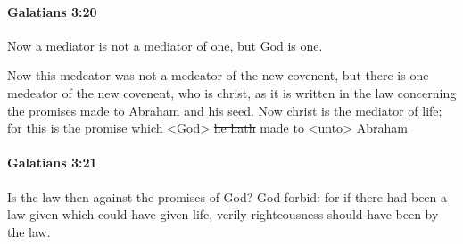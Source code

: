 		\paragraph{Galatians 3:20} %
			\label{GALATIANS-3-20}

			Now a mediator is not a mediator of one, but God is one.

			\begin{framed}
			\scriptsize
				\begin{compactdesc}
					\item[SBLG] 
					\item[NTR2] Now this medeator was not a medeator of the new covenent, but there is one medeator of the new covenent, who is christ, as it is written in the law concerning the promises made to Abraham and his seed. Now christ is the mediator of life; for this is the promise which <God> \sout{he hath} made to <unto> Abraham
				\end{compactdesc}
			\end{framed}

		\paragraph{Galatians 3:21} %
			\label{GALATIANS-3-21}

			Is the law then against the promises of God?  God forbid: for if there had been a law given which could have given life, verily righteousness should have been by the law.

